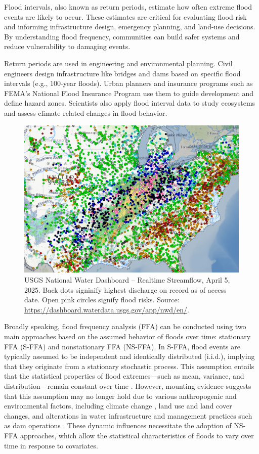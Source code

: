 \documentclass{tufte-handout}\usepackage[]{graphicx}\usepackage[]{xcolor}
\begin{document}
Flood intervals, also known as return periods, estimate how often extreme flood events are likely to occur. These estimates are critical for evaluating flood risk and informing infrastructure design, emergency planning, and land-use decisions. By understanding flood frequency, communities can build safer systems and reduce vulnerability to damaging events.

Return periods are used in engineering and environmental planning. Civil engineers design infrastructure like bridges and dams based on specific flood intervals (e.g., 100-year floods). Urban planners and insurance programs such as FEMA's National Flood Insurance Program use them to guide development and define hazard zones. Scientists also apply flood interval data to study ecosystems and assess climate-related changes in flood behavior.

\begin{figure}
	\centering
		\includegraphics[width=1.00\textwidth]{figure/USGS_Discharge_20250405.png}
		\caption{USGS National Water Dashboard -- Realtime Streamflow, April 5, 2025. Back dots signinify highest discharge on record as of access date. Open pink circles signify flood risks. Source: \url{https://dashboard.waterdata.usgs.gov/app/nwd/en/}.}
	\label{fig:USGS_Discharge_20250405}
\end{figure}

Broadly speaking, flood frequency analysis (FFA) can be conducted using two main approaches based on the assumed behavior of floods over time: stationary FFA (S-FFA) and nonstationary FFA (NS-FFA). In S-FFA, flood events are typically assumed to be independent and identically distributed (i.i.d.), implying that they originate from a stationary stochastic process. This assumption entails that the statistical properties of flood extremes—such as mean, variance, and distribution—remain constant over time \citep{villarini2009flood}. However, mounting evidence suggests that this assumption may no longer hold due to various anthropogenic and environmental factors, including climate change \citep{milly2008stationarity}, land use and land cover changes, and alterations in water infrastructure and management practices such as dam operations \citep{merz2012hess}. These dynamic influences necessitate the adoption of NS-FFA approaches, which allow the statistical characteristics of floods to vary over time in response to covariates.
\end{document}
